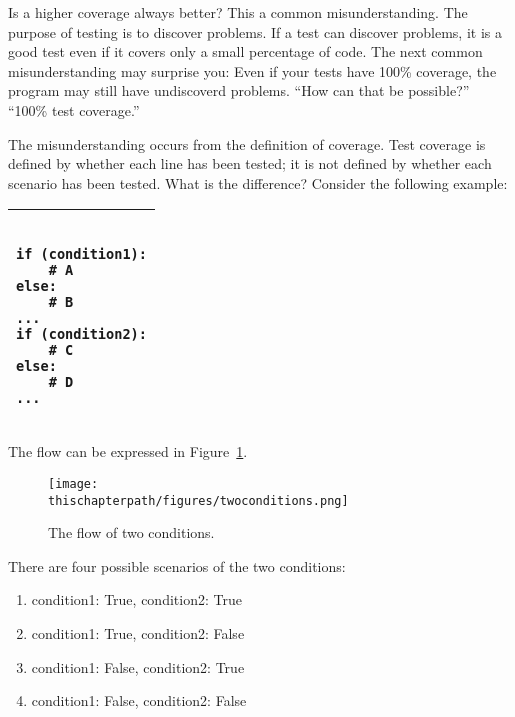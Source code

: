 {\begin{comment}
\end{verbatim}
\\ \hline
\end{tabular}
\vspace{0.2in}

\end{comment}

Is a
higher coverage always better? This a common misunderstanding.  The
purpose of testing is to discover problems.  If a test can discover
problems, it is a good test even if it covers only a small percentage
of code.  The next common misunderstanding may surprise you: Even if
your tests have 100\% coverage, the program may still have undiscoverd
problems.  ``How can that be possible?'' ``100\% test coverage.''

The misunderstanding occurs from the definition of coverage.  Test
coverage is defined by whether each line has been tested; it is not
defined by whether each scenario has been tested. What is the
difference? Consider the following example:

\vspace{0.2in}

\noindent
\begin{tabular}{|p{5in}|}\hline
\begin{verbatim}

if (condition1):
    # A
else:
    # B
...
if (condition2):
    # C
else:
    # D
...
\end{verbatim}
\\ \hline
\end{tabular}
\vspace{0.2in}

The flow can be expressed in Figure~\ref{fig:twoconditions}.

\begin{figure}[h] \centering
{\texttt{[image: \\thischapterpath/figures/twoconditions.png]}}
\caption{The flow of two conditions.}
\label{fig:twoconditions}
\end{figure}

There are four possible scenarios of the two conditions:

\begin{enumerate}
\item condition1: True, condition2: True
\item condition1: True, condition2: False
\item condition1: False, condition2: True
\item condition1: False, condition2: False
\end{enumerate}

}
